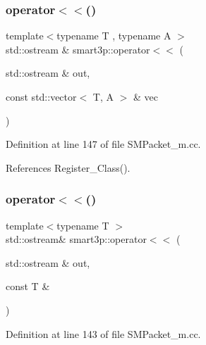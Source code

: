 \subsubsection{\texorpdfstring{operator$<$$<$()}{operator<<()}\hspace{0.1cm}{\footnotesize\ttfamily [1/2]}}
{\footnotesize\ttfamily template$<$typename T , typename A $>$ \\
std\+::ostream \& smart3p\+::operator$<$$<$ (\begin{DoxyParamCaption}\item[{std\+::ostream \&}]{out,  }\item[{const std\+::vector$<$ T, A $>$ \&}]{vec }\end{DoxyParamCaption})\hspace{0.3cm}{\ttfamily [inline]}}



Definition at line 147 of file S\+M\+Packet\+\_\+m.\+cc.



References Register\+\_\+\+Class().

\mbox{\label{namespacesmart3p_a3270a6dc130a886b9e5a2ae79aa2dc49}} 
\subsubsection{\texorpdfstring{operator$<$$<$()}{operator<<()}\hspace{0.1cm}{\footnotesize\ttfamily [2/2]}}
{\footnotesize\ttfamily template$<$typename T $>$ \\
std\+::ostream\& smart3p\+::operator$<$$<$ (\begin{DoxyParamCaption}\item[{std\+::ostream \&}]{out,  }\item[{const T \&}]{ }\end{DoxyParamCaption})\hspace{0.3cm}{\ttfamily [inline]}}



Definition at line 143 of file S\+M\+Packet\+\_\+m.\+cc.

\mbox{\label{namespacesmart3p_a6784c09401baba4edc413e8e152520c3}} 
